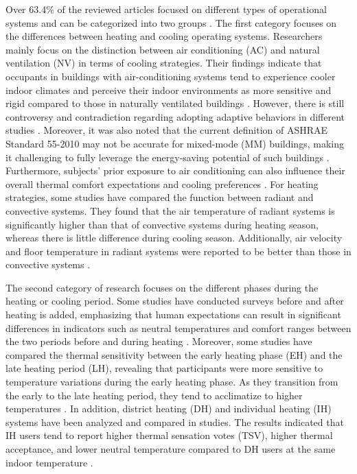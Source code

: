 \documentclass[final,3p,times,12pt]{elsarticle}
\begin{document}
Over 63.4\% of the reviewed articles focused on different types of operational systems and can be categorized into two groups \cite{humphreysChapter15Dependence1981,kwonRelationshipQualityBuilding2011}. The first category focuses on the differences between heating and cooling operating systems. Researchers mainly focus on the distinction between air conditioning (AC) and natural ventilation (NV) in terms of cooling strategies. Their findings indicate that occupants in buildings with air-conditioning systems tend to experience cooler indoor climates and perceive their indoor environments as more sensitive and rigid compared to those in naturally ventilated buildings \cite{zhangThermalComfortBuildings2013a}. However, there is still controversy and contradiction regarding adopting adaptive behaviors in different studies \cite{jiaThermalComfortMixedmode2020}. Moreover, it was also noted that the current definition of ASHRAE Standard 55-2010 may not be accurate for mixed-mode (MM) buildings, making it challenging to fully leverage the energy-saving potential of such buildings \cite{deubleMixedmodeBuildingsDouble2012}. Furthermore, subjects' prior exposure to air conditioning can also influence their overall thermal comfort expectations and cooling preferences \cite{vecchiThermalHistoryIts}. For heating strategies, some studies have compared the function between radiant and convective systems. They found that the air temperature of radiant systems is significantly higher than that of convective systems during heating season, whereas there is little difference during cooling season. Additionally, air velocity and floor temperature in radiant systems were reported to be better than those in convective systems \cite{duComparisonThermalComfort2022a}. 

The second category of research focuses on the different phases during the heating or cooling period. Some studies have conducted surveys before and after heating is added, emphasizing that human expectations can result in significant differences in indicators such as neutral temperatures and comfort ranges between the two periods before and during heating \cite{wangThermalResponsesDifferent2011a}. Moreover, some studies have compared the thermal sensitivity between the early heating phase (EH) and the late heating period (LH), revealing that participants were more sensitive to temperature variations during the early heating phase. As they transition from the early to the late heating period, they tend to acclimatize to higher temperatures \cite{wangInfluenceOutdoorIndoor2018}. In addition, district heating (DH) and individual heating (IH) systems have been analyzed and compared in studies. The results indicated that IH users tend to report higher thermal sensation votes (TSV), higher thermal acceptance, and lower neutral temperature compared to DH users at the same indoor temperature \cite{caoIndividualDistrictHeating2014,luoCanPersonalControl2014}.
\end{document}
